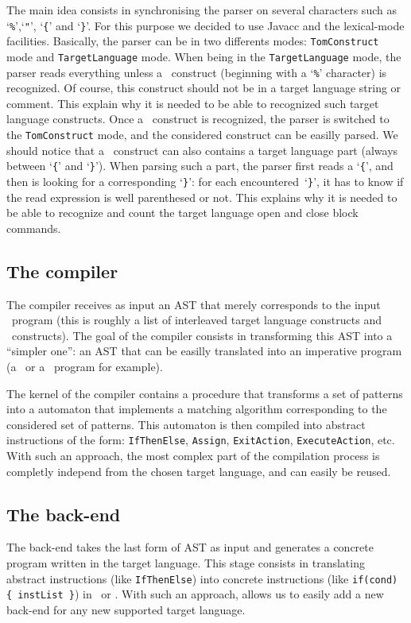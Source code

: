The main idea consists in synchronising the parser on several
characters such as `\texttt{\%}',`\texttt{"}', `\texttt{\{}' and
`\texttt{\}}'. For this purpose we decided to use \textsf{Javacc} and
the lexical-mode facilities. Basically, the parser can be in two
differents modes: \texttt{TomConstruct} mode and
\texttt{TargetLanguage} mode.
When being in the \texttt{TargetLanguage} mode, the parser reads
everything unless a \TOM\ construct (beginning with a `\texttt{\%}'
character) is recognized. Of course, this construct should not be in a
target language string or comment. This explain why it is needed to be
able to recognized such target language constructs.
Once a \TOM\ construct is recognized, the parser is switched to the
\texttt{TomConstruct} mode, and the considered construct can be
easilly parsed. 
We should notice that a \TOM\ construct can also contains a target
language part (always between `\texttt{\{}' and `\texttt{\}}').
When parsing such a part, the parser first reads a `\texttt{\{}', and
then is looking for a corresponding `\texttt{\}}': for each
encountered~`\texttt{\}}', it has to know if the read expression is
well parenthesed or not. This explains why it is needed to be able to
recognize and count the target language open and close block
commands. 

\subsection{The compiler}
The compiler receives as input an AST that merely corresponds to the 
input \TOM\ program (this is roughly a list of interleaved target
language constructs and \TOM\ constructs).
The goal of the compiler consists in transforming this AST into a
``simpler one'': an AST that can be easilly translated into an
imperative program (a \C\ or a \Java\ program for example).

The kernel of the compiler contains a procedure that transforms a set
of patterns into a automaton that implements a matching algorithm
corresponding to the considered set of patterns. 
This automaton is then compiled into abstract instructions of the
form: \texttt{IfThenElse}, \texttt{Assign}, \texttt{ExitAction}, 
\texttt{ExecuteAction}, etc. 
With such an approach, the most complex part of the compilation process
is completly independ from the chosen target language, and can easily
be reused.


\subsection{The back-end}
The back-end takes the last form of AST as input and generates a
concrete program written in the target language. This stage consists
in translating abstract instructions (like \texttt{IfThenElse}) into
concrete instructions (like \texttt{if(cond) \{ instList \}}) in \C\
or \Java.  
With such an approach, allows us to easily add a new back-end for any 
new supported target language.


